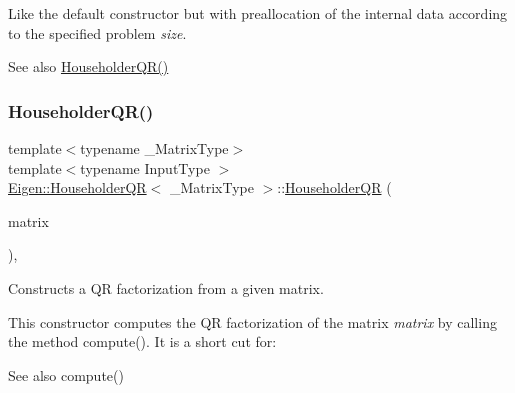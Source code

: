 Like the default constructor but with preallocation of the internal data according to the specified problem {\itshape size}. \begin{DoxySeeAlso}{See also}
\mbox{\hyperlink{class_eigen_1_1_householder_q_r_a974adb10a0e066057aeb3b360df68380}{Householder\+Q\+R()}} 
\end{DoxySeeAlso}
\mbox{\label{class_eigen_1_1_householder_q_r_afa7cfb4faa89195c4dc8d196924c8230}} 
\subsubsection{\texorpdfstring{HouseholderQR()}{HouseholderQR()}\hspace{0.1cm}{\footnotesize\ttfamily [3/4]}}
{\footnotesize\ttfamily template$<$typename \+\_\+\+Matrix\+Type$>$ \\
template$<$typename Input\+Type $>$ \\
\mbox{\hyperlink{class_eigen_1_1_householder_q_r}{Eigen\+::\+Householder\+QR}}$<$ \+\_\+\+Matrix\+Type $>$\+::\mbox{\hyperlink{class_eigen_1_1_householder_q_r}{Householder\+QR}} (\begin{DoxyParamCaption}\item[{const \mbox{\hyperlink{struct_eigen_1_1_eigen_base}{Eigen\+Base}}$<$ Input\+Type $>$ \&}]{matrix }\end{DoxyParamCaption})\hspace{0.3cm}{\ttfamily [inline]}, {\ttfamily [explicit]}}



Constructs a QR factorization from a given matrix. 

This constructor computes the QR factorization of the matrix {\itshape matrix} by calling the method compute(). It is a short cut for\+:


\begin{DoxyCode}{0}
\end{DoxyCode}


\begin{DoxySeeAlso}{See also}
compute() 
\end{DoxySeeAlso}
\mbox{\label{class_eigen_1_1_householder_q_r_a95a53f8479ee147d7b0ccab71c13e45d}} 
